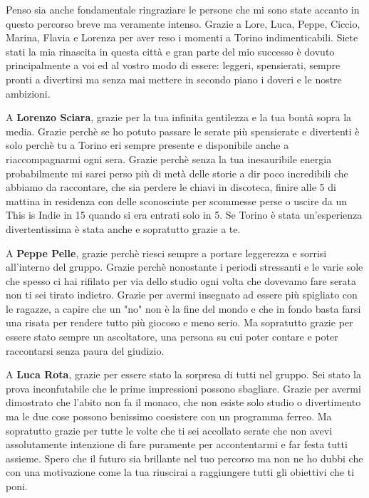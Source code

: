 \documentclass[cucitura%
,12pt%
]{toptesi}
\begin{document}
Penso sia anche fondamentale ringraziare le persone che mi sono state accanto in questo percorso breve ma veramente intenso. Grazie a Lore, Luca, Peppe, Ciccio, Marina, Flavia e Lorenza per aver reso i momenti a Torino indimenticabili. Siete stati la mia rinascita in questa città
e gran parte del mio successo è dovuto principalmente a voi ed al vostro modo di essere: leggeri, spensierati, sempre pronti a divertirsi ma senza mai mettere in secondo piano i doveri e le nostre ambizioni. 

A \textbf{Lorenzo Sciara}, grazie per la tua infinita gentilezza e la tua bontà sopra la media. Grazie perchè se ho potuto passare le serate più spensierate e divertenti è solo perchè tu a Torino eri sempre presente e disponibile anche a riaccompagnarmi ogni sera. Grazie perchè senza 
la tua inesauribile energia probabilmente mi sarei perso più di metà delle storie a dir poco incredibili che abbiamo da raccontare, che sia perdere le chiavi in discoteca, finire alle 5 di mattina in residenza con delle sconosciute per scommesse perse o uscire da un This is Indie in 15 quando si era entrati solo in 5.
Se Torino è stata un'esperienza divertentissima è stata anche e sopratutto grazie a te.

A \textbf{Peppe Pelle}, grazie perchè riesci sempre a portare  leggerezza e sorrisi all'interno del gruppo. Grazie perchè nonostante i periodi stressanti e le varie sole che spesso ci hai rifilato per via dello studio ogni volta che dovevamo fare serata non ti sei tirato indietro. Grazie per avermi insegnato ad essere più
spigliato con le ragazze, a capire che un "no" non è la fine del mondo e che in fondo basta farsi una risata per rendere tutto più giocoso e meno serio. Ma sopratutto grazie per essere stato sempre un ascoltatore, una persona su cui poter contare e poter raccontarsi senza paura del giudizio.

A \textbf{Luca Rota}, grazie per essere stato la sorpresa di tutti nel gruppo. Sei stato la prova inconfutabile che le prime impressioni possono sbagliare. Grazie per avermi dimostrato che l'abito non fa il monaco, che non esiste solo studio o divertimento ma le due cose possono benissimo coesistere con un programma ferreo. Ma sopratutto
grazie per tutte le volte che ti sei accollato serate che non avevi assolutamente intenzione di fare puramente per accontentarmi e far festa tutti assieme. Spero che il futuro sia brillante nel tuo percorso ma non ne ho dubbi che con una motivazione come la tua riuscirai a raggiungere tutti gli obiettivi che ti poni.
\end{document}

